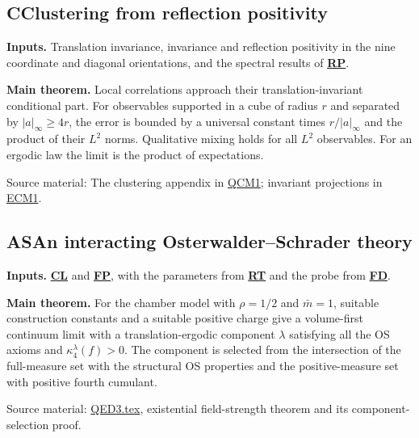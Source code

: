 \documentclass[11pt]{article}
\newcommand{\Code}[1]{\hyperlink{block-#1}{\textbf{#1}}}
\newcommand{\Block}[2]{\hypertarget{block-#1}{}%
 \subsection*{\textcolor{flowgreen}{#1}\quad #2}}
\newcommand{\ExternalBlock}[2]{\hypertarget{block-#1}{}%
 \subsection*{\textcolor{manuscriptblue}{#1}\quad #2}}
\newcommand{\Inputs}[1]{\textbf{Inputs.} #1\par}
\newcommand{\Theorem}[1]{\textbf{Main theorem.} #1\par}
\newcommand{\Sources}[1]{\par{\small\textcolor{flowgray}{Source material:} #1\par}}
\newcommand{\Repo}{https://github.com/ethanwsussman/Yang--Mills-LLM-experiment}
\newcommand{\Old}[2]{\href{\Repo/#1}{#2}}
\newcommand{\ECsource}{\Old{tree/main/QED3/OLD/Submanuscripts/Continuum\%20components\%20and\%20clustering\%20\%28EC1\%29}{ECM1}}
\newcommand{\QCsource}{\Old{blob/main/QED3/QED3_supplement.tex}{QCM1}}
\newcommand{\CurrentQEsource}{\Old{blob/main/QED3/QED3.tex}{QED3.tex}}
\begin{document}
\ExternalBlock{C}{Clustering from reflection positivity}
\Inputs{Translation invariance, invariance and reflection positivity
in the nine coordinate and diagonal orientations, and the spectral
results of \Code{RP}.}
\Theorem{Local correlations approach their translation-invariant
conditional part. For observables supported in a cube of radius \(r\)
and separated by \(\lvert a\rvert_\infty\ge4r\), the error is bounded by
a universal constant times \(r/\lvert a\rvert_\infty\) and the product
of their \(L^2\) norms. Qualitative mixing holds for all \(L^2\)
observables. For an ergodic law the limit is the product of expectations.}
\Sources{The clustering appendix in \QCsource;
invariant projections in \ECsource.}

\Block{AS}{An interacting Osterwalder--Schrader theory}
\Inputs{\Code{CL} and \Code{FP}, with the parameters from \Code{RT}
and the probe from \Code{FD}.}
\Theorem{For the chamber model with \(\rho=1/2\) and
\(\bar m=1\), suitable construction constants and a suitable positive
charge give a volume-first continuum limit with a translation-ergodic
component \(\lambda\) satisfying all the OS axioms and
\(\kappa_4^\lambda(f)>0\). The component is selected from the
intersection of the full-measure set with the structural OS properties
and the positive-measure set with positive fourth cumulant.}
\Sources{\CurrentQEsource, existential field-strength theorem and its
component-selection proof.}

\clearpage
\end{document}
